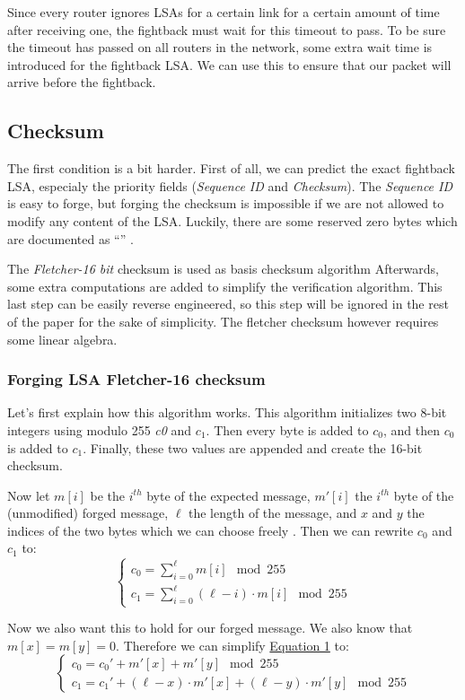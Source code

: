 \documentclass[11pt,a4paper,oneside]{article}
\newcommand{\lsubsection}[2]{\subsection{#1}\label{sec:#2}}
\newcommand{\lsubsubsection}[2]{\subsubsection{#1}\label{sec:#2}}
\begin{document}
    Since every router ignores LSAs for a certain link for a certain amount of time after receiving one, the fightback must wait for this timeout to pass. To be sure the timeout has passed on all routers in the network, some extra wait time is introduced for the fightback LSA. We can use this to ensure that our packet will arrive before the fightback.

	\lsubsection{Checksum}{checksum}
    The first condition is a bit harder. First of all, we can predict the exact fightback LSA, especialy the priority fields (\textit{Sequence ID} and \textit{Checksum}). The \textit{Sequence ID} is easy to forge, but forging the checksum is impossible if we are not allowed to modify any content of the LSA. Luckily, there are some reserved zero bytes which are documented as ``'' \cite[appendix A.3.1]{rfc-5340}.
    
    The \textit{Fletcher-16 bit}\cite{fletcher} checksum is used as basis checksum algorithm Afterwards, some extra computations are added to simplify the verification algorithm. This last step can be easily reverse engineered, so this step will be ignored in the rest of the paper for the sake of simplicity. The fletcher checksum however requires some linear algebra.
    
    
    \lsubsubsection{Forging LSA Fletcher-16 checksum}{flet-algo}
    Let's first explain how this algorithm works. This algorithm initializes two 8-bit integers using modulo 255 \textit{c0} and $c_1$. Then every byte is added to $c_0$, and then $c_0$ is added to $c_1$. Finally, these two values are appended and create the 16-bit checksum.
	    
	    Now let $m[i]$ be the $i^{th}$ byte of the expected message, $m'[i]$ the $i^{th}$ byte of the (unmodified) forged message, $\ell$ the length of the message, and $x$ and $y$ the indices of the two bytes which we can choose freely . Then we can rewrite $c_0$ and $c_1$ to:
\begin{equation}\label{eq:1}
\begin{cases}
	c_0 = \sum\limits_{i=0}^{\ell} m[i] \mod{255}\\
	c_1 = \sum\limits_{i=0}^{\ell} (\ell - i) \cdot m[i] \mod{255}
\end{cases}
\end{equation}

    		Now we also want this to hold for our forged message. We also know that $m[x] = m[y] = 0$. Therefore we can simplify \hyperref[eq:1]{Equation 1} to:
\begin{equation}\label{eq:2}
\begin{cases}
	c_0 = c_0' + m'[x] + m'[y] \mod{255}\\
	c_1 = c_1' + (\ell - x) \cdot m'[x] + (\ell - y) \cdot m'[y] \mod{255}
\end{cases}
\end{equation}
	
\end{document}
